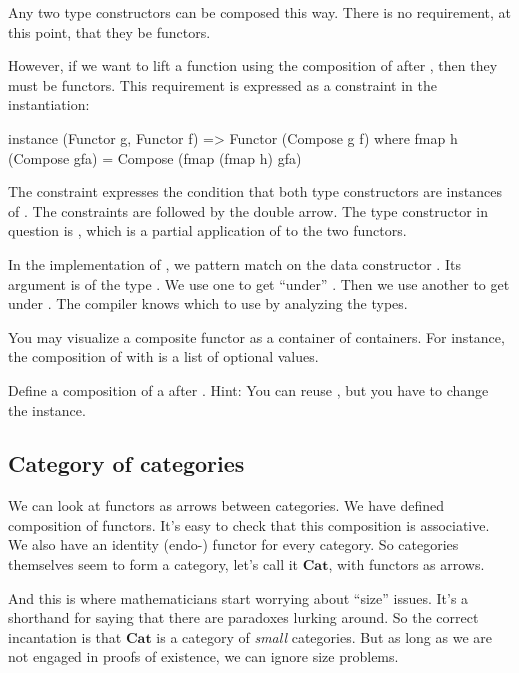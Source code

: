 \documentclass[DaoFP]{subfiles}
\begin{document}
Any two type constructors can be composed this way. There is no requirement, at this point, that they be functors. 

However, if we want to lift a function using the composition of  after , then they must be functors. This requirement is expressed as a constraint in the instantiation:
\begin{haskell}
instance (Functor g, Functor f) => Functor (Compose g f) where
  fmap h (Compose gfa) = Compose (fmap (fmap h) gfa)
\end{haskell}
The constraint  expresses the condition that both type constructors are instances of . The constraints are followed by the double arrow. The type constructor in question is , which is a partial application of  to the two functors. 

In the implementation of , we pattern match on the data constructor . Its argument  is of the type . We use one  to get ``under'' . Then we use another  to get under . The compiler knows which  to use by analyzing the types. 

You may visualize a composite functor as a container of containers. For instance, the composition of \hask{[]} with  is a list of optional values. 

\begin{exercise}
Define a composition of a  after . Hint: You can reuse , but you have to change the instance.
\end{exercise}


\subsection{Category of categories}

We can look at functors as arrows between categories. We have defined composition of functors. It's easy to check that this composition is associative. We also have an identity (endo-) functor for every category. So categories themselves seem to form a category, let's call it $\mathbf{Cat}$, with functors as arrows. 

And this is where mathematicians start worrying about ``size'' issues. It's a shorthand for saying that there are paradoxes lurking around. So the correct incantation is that $\mathbf{Cat}$ is a category of \emph{small} categories. But as long as we are not engaged in proofs of existence, we can ignore size problems.
\end{document}
